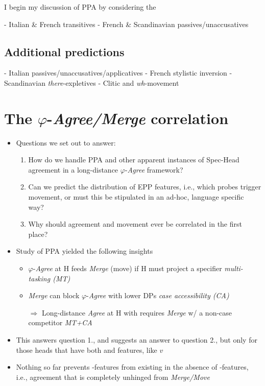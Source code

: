 \documentclass[letterpaper,10pt]{handout_nick}
\begin{document}
I begin my discussion of PPA by considering the 


- Italian \& French transitives
- French \& Scandinavian passives/unaccusatives

\subsection{Additional predictions}
- Italian passives/unaccusatives/applicatives
- French stylistic inversion
- Scandinavian \emph{there}-expletives
- Clitic and \emph{wh}-movement




\section{The $\varphi$-\emph{Agree/Merge} correlation}
\begin{itemize}
\item Questions we set out to answer:
\begin{enumerate}
\item How do we handle PPA and other apparent instances of Spec-Head agreement in a long-distance $\varphi$-\emph{Agree} framework?
\item Can we predict the distribution of EPP features, i.e., which probes trigger movement, or must this be stipulated in an ad-hoc, language specific way?
\item Why should agreement and movement ever be correlated in the first place? 
\end{enumerate}
\item Study of PPA yielded the following insights
\begin{itemize}
\item $\varphi$-\emph{Agree} at H feeds \emph{Merge} (move) if H must project a specifier \hfill \emph{multi-tasking (MT)}
\item \emph{Merge} can block $\varphi$-\emph{Agree} with lower DPs \hfill \emph{case accessibility (CA)}
\item[$\Rightarrow$] Long-distance \emph{Agree} at H with \fm{$\varphi$} requires \emph{Merge} w/ a non-case competitor \hfill \emph{MT+CA} 
\end{itemize}
\item This answers question 1., and suggests an answer to question 2., but only for those heads that have both \fm{$\varphi$} and \fa{$\varphi$} features, like $v$
\item Nothing so far prevents \fa{$\varphi$}-features from existing in the absence of \fm{$\varphi$}-features, i.e., agreement that is completely unhinged from \emph{Merge/Move} 

\end{itemize}
\end{document}
